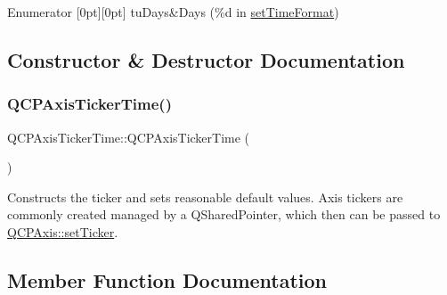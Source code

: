 \begin{DoxyEnumFields}{Enumerator}
[0pt][0pt]{}\mbox{\label{class_q_c_p_axis_ticker_time_a5c48ded8c6d3a1aca9b68219469fea3eaf9729e64545307a80a0e3527d6da6556}} 
tu\+Days&Days (\%d in \hyperlink{class_q_c_p_axis_ticker_time_a2f30b6e5125bce4256be9ce3177088ea}{set\+Time\+Format}) \\
\hline

\end{DoxyEnumFields}


\subsection{Constructor \& Destructor Documentation}
\mbox{\label{class_q_c_p_axis_ticker_time_a5145aac1d2117fdac411d9e8552cc41b}} 
\subsubsection{\texorpdfstring{Q\+C\+P\+Axis\+Ticker\+Time()}{QCPAxisTickerTime()}}
{\footnotesize\ttfamily Q\+C\+P\+Axis\+Ticker\+Time\+::\+Q\+C\+P\+Axis\+Ticker\+Time (\begin{DoxyParamCaption}{ }\end{DoxyParamCaption})}

Constructs the ticker and sets reasonable default values. Axis tickers are commonly created managed by a Q\+Shared\+Pointer, which then can be passed to \hyperlink{class_q_c_p_axis_a4ee03fcd2c74d05cd1a419b9af5cfbdc}{Q\+C\+P\+Axis\+::set\+Ticker}. 

\subsection{Member Function Documentation}
\mbox{\label{class_q_c_p_axis_ticker_time_a6b58a98e4d64c6764aa61a707e4a344d}} 

